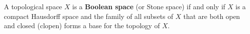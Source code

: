 A topological space $X$ is a \textbf{Boolean space} (or Stone space) if and only if $X$ is a compact Hausdorff space and the family of all subsets of $X$ that are both open and closed (clopen) forms a base for the topology of $X$.

